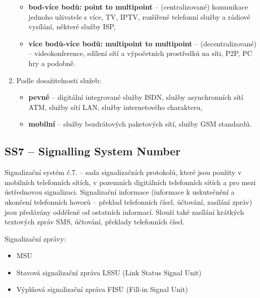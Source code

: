 \begin{enumerate}
\begin{itemize}
        \item \textbf{bod-více bodů: point to multipoint} – (centralizované) komunikace jednoho uživatele s více, TV, IPTV, rozšířené telefonní služby a rádiové vysílání, některé služby ISP,
        \item \textbf{více bodů-více bodů: multipoint to multipoint} – (decentralizované) – videokonference, sdílení sítí a výpočetních prostředků na síti, P2P, PC hry a podobně.
    \end{itemize}
    \item Podle dosažitelnosti služeb:
    \begin{itemize}
        \item \textbf{pevné} – digitální integrované služby ISDN, služby asynchronních sítí ATM, služby sítí LAN, služby internetového charakteru,
        \item \textbf{mobilní} – služby bezdrátových paketových sítí, služby GSM standardů.
    \end{itemize}
\end{enumerate}

\subsection{SS7 – Signalling System Number}
Signalizační systém č.7. -- sada signalizačních protokolů, které jsou použity v mobilních telefonních sítích, v pozemních digitálních telefonních
sítích a pro mezi ústřednovou signalizaci. Signalizační informace (informace k uskutečnění a ukončení telefonních hovorů -- překlad telefonních čísel, účtování, zasílání zpráv) jsou předávány odděleně od ostatních informací. Slouží také zasílání krátkých textových zpráv SMS, účtování, překlady telefonních čísel. 

Signalizační zprávy:
\begin{itemize}
    \item MSU
    \item Stavová signalizační zpráva LSSU (Link Status Signal Unit)
    \item Výplňová signalizační zpráva FISU (Fill-in Signal Unit)
\end{itemize}

